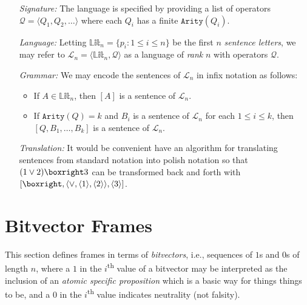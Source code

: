 \documentclass[a4paper, 11pt]{article} %
\newcommand{\tuple}[1]{\langle#1\rangle} %
\newcommand{\set}[1]{\lbrace#1\rbrace} %
\newcommand{\Lit}[0]{\mathbb{Lit}}
\newcommand{\arity}[1]{\texttt{Arity}(#1)}
\renewcommand{\L}[0]{\mathcal{L}}
\newcommand{\Q}[0]{\mathcal{Q}}
\begin{document}
\begin{enumerate}
  \item[\it Signature:] The language is specified by providing a list of operators $\Q=\tuple{Q_1,Q_2,\ldots}$ where each $Q_i$ has a finite $\arity{Q_i}$.
  \item[\it Language:] Letting $\Lit_n=\set{p_i:1\leq i\leq n}$ be the first $n$ \textit{sentence letters}, we may refer to $\L_n=\tuple{\Lit_n,\Q}$ as a language of \textit{rank} $n$ with operators $\Q$.
  \item[\it Grammar:] We may encode the sentences of $\L_n$ in infix notation as follows:
    \begin{itemize}
      \item If $A\in\Lit_n$, then $[A]$ is a sentence of $\L_n$.
      \item If $\arity{Q}=k$ and $B_i$ is a sentence of $\L_n$ for each $1\leq i\leq k$, then $[Q,B_1,\ldots,B_k]$ is a sentence of $\L_n$.
    \end{itemize}
  \item[\it Translation:] It would be convenient have an algorithm for translating sentences from standard notation into polish notation so that $( 1 \vee 2 ) \boxright 3$ can be transformed back and forth with $[\boxright, \tuple{\vee, \tuple{1}, \tuple{2}}, \tuple{3}]$.
\end{enumerate}

\section{Bitvector Frames}

This section defines frames in terms of \textit{bitvectors}, i.e., sequences of $1$s and $0$s of length $n$, where a $1$ in the $i$\textsuperscript{th} value of a bitvector may be interpreted as the inclusion of an \textit{atomic specific proposition} which is a basic way for things things to be, and a $0$ in the $i$\textsuperscript{th} value indicates neutrality (not falsity).
\end{document}

